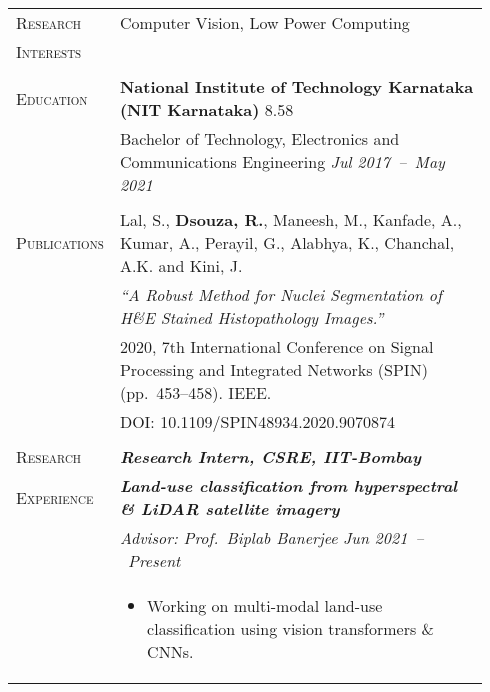 \documentclass[letterpaper, 10pt, oneside]{article}
\newcommand{\stitle}[1]{\normalsize{\textsc{#1}}}
\newcommand{\bdit}[1]{\textit{\textbf{#1}}}
\begin{document}
\noindent \begin{longtable}{@{} p{0.14\linewidth} p{0.8\linewidth}}

\stitle{Research}  & Computer Vision, Low Power Computing\\
\stitle{Interests} & \\
\\


\stitle{Education} & \textbf{National Institute of Technology Karnataka (NIT Karnataka)} \hfill 8.58 \\
                   & Bachelor of Technology, Electronics and Communications Engineering \hfill \hspace{-3em} \textit{Jul 2017\ --\ May 2021} \\
\\


\stitle{Publications} & Lal, S., \textbf{Dsouza, R.}, Maneesh, M., Kanfade, A., Kumar, A., Perayil, G., Alabhya, K., Chanchal, A.K. and Kini, J. \\
                      & \textit{``A Robust Method for Nuclei Segmentation of H\&E Stained Histopathology Images.''} \\
                      & 2020, 7th International Conference on Signal Processing and Integrated Networks (SPIN) (pp.~453--458)\@. IEEE\@.  \\
                      & \textcolor{dark-purple}{DOI\@: 10.1109/SPIN48934.2020.9070874} \\
\\


\stitle{Research}   & \bdit{Research Intern, CSRE, IIT-Bombay} \\
\stitle{Experience} & \bdit{Land-use classification from hyperspectral \& LiDAR satellite imagery} \\
    & \textit{Advisor: Prof.\ Biplab Banerjee} \hfill \hspace{-3em} \textit{Jun 2021\ --\ Present} \\
    & \parbox{0.8\textwidth}{%
        \begin{itemize}[leftmargin=*, itemsep=-0.88ex, topsep=-0.88ex]
            \item Working on multi-modal land-use classification using vision transformers \& CNNs.
        \end{itemize}
    }
\\
\\


\end{longtable}
\end{document}
